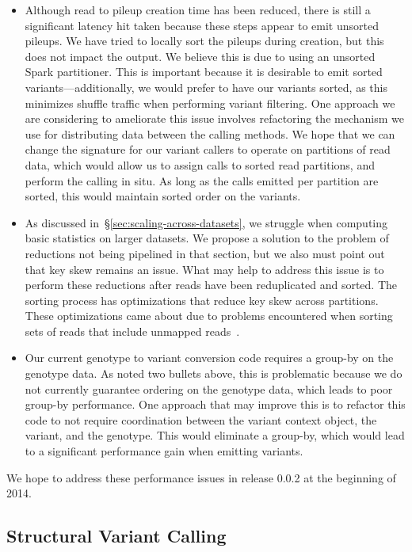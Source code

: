 \documentclass{acm_proc_article-sp}
\begin{document}
\begin{itemize}
\item Although read to pileup creation time has been reduced, there is still a significant latency hit taken because these steps
appear to emit unsorted pileups. We have tried to locally sort the pileups during creation, but this does not impact the output. We
believe this is due to using an unsorted Spark partitioner. This is important because it is desirable to emit sorted variants---additionally,
we would prefer to have our variants sorted, as this minimizes shuffle traffic when performing variant filtering. One approach we are
considering to ameliorate this issue involves refactoring the mechanism we use for distributing data between the calling methods.
We hope that we can change the signature for our variant callers to operate on partitions of read data, which would allow us to 
assign calls to sorted read partitions, and perform the calling in situ. As long as the calls emitted per partition are sorted, this would
maintain sorted order on the variants.
\item As discussed in~\S\ref{sec:scaling-across-datasets}, we struggle when computing basic statistics on larger datasets. We propose
a solution to the problem of reductions not being pipelined in that section, but we also must point out that key skew remains an issue.
What may help to address this issue is to perform these reductions after reads have been reduplicated and sorted. The sorting process
has optimizations that reduce key skew across partitions. These optimizations came about due to problems encountered when sorting
sets of reads that include unmapped reads~\cite{massie13}.
\item Our current genotype to variant conversion code requires a group-by on the genotype data. As noted two bullets above, this is
problematic because we do not currently guarantee ordering on the genotype data, which leads to poor group-by performance. One
approach that may improve this is to refactor this code to not require coordination between the variant context object, the variant,
and the genotype. This would eliminate a group-by, which would lead to a significant performance gain when emitting variants.
\end{itemize}

We hope to address these performance issues in release 0.0.2 at the beginning of 2014.

\subsection{Structural Variant Calling}
\label{sec:structural-variant-callling}
\end{document}
